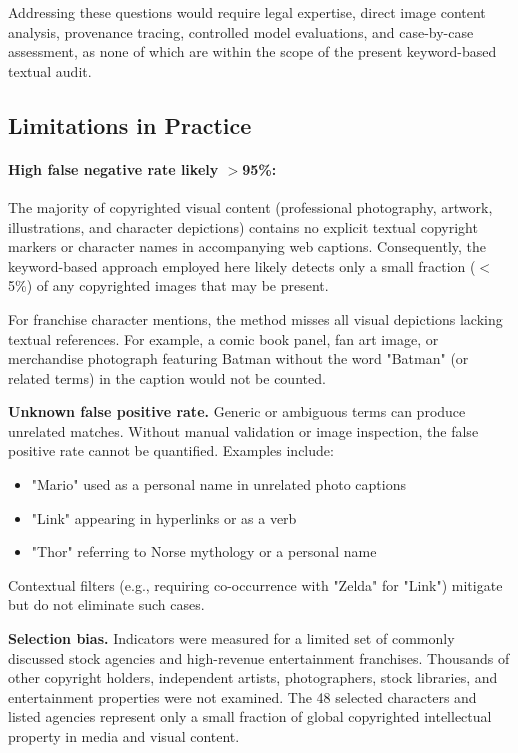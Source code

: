 \documentclass[11pt]{article}
\begin{document}
Addressing these questions would require legal expertise, direct image content analysis, provenance tracing, controlled model evaluations, and case-by-case assessment, as none of which are within the scope of the present keyword-based textual audit.

\subsection{Limitations in Practice}
\paragraph{High false negative rate likely $>$95\%:} The majority of copyrighted visual content (professional photography, artwork, illustrations, and character depictions) contains no explicit textual copyright markers or character names in accompanying web captions. Consequently, the keyword-based approach employed here likely detects only a small fraction ($<$5\%) of any copyrighted images that may be present.

For franchise character mentions, the method misses all visual depictions lacking textual references. For example, a comic book panel, fan art image, or merchandise photograph featuring Batman without the word "Batman" (or related terms) in the caption would not be counted.

\textbf{Unknown false positive rate.}  
Generic or ambiguous terms can produce unrelated matches. Without manual validation or image inspection, the false positive rate cannot be quantified. Examples include:
\begin{itemize}
\item "Mario" used as a personal name in unrelated photo captions
\item "Link" appearing in hyperlinks or as a verb
\item "Thor" referring to Norse mythology or a personal name
\end{itemize}
Contextual filters (e.g., requiring co-occurrence with "Zelda" for "Link") mitigate but do not eliminate such cases.

\textbf{Selection bias.}  
Indicators were measured for a limited set of commonly discussed stock agencies and high-revenue entertainment franchises. Thousands of other copyright holders, independent artists, photographers, stock libraries, and entertainment properties were not examined. The 48 selected characters and listed agencies represent only a small fraction of global copyrighted intellectual property in media and visual content.
\end{document}
